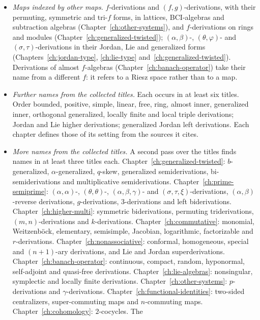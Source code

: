 \begin{itemize}
(Chapter~\ref{ch:polynomial-weyl}): right derivations. Partial derivations of
functions of $n$ variables. Each chapter defines its kinds from the sources it cites.
\item \emph{Maps indexed by other maps.} $f$-derivations and
$(f,g)$-derivations, with their permuting, symmetric and tri-$f$ forms, in
lattices, BCI-algebras and subtraction algebras (Chapter~\ref{ch:other-systems}),
and $f$-derivations on rings and modules (Chapter~\ref{ch:generalized-twisted});
$(\alpha,\beta)$-, $(\theta,\varphi)$- and $(\sigma,\tau)$-derivations in their
Jordan, Lie and generalized forms (Chapters~\ref{ch:jordan-type},
\ref{ch:lie-type} and~\ref{ch:generalized-twisted}). Derivations of almost
$f$-algebras (Chapter~\ref{ch:banach-operator}) take their name from a different
$f$: it refers to a Riesz space rather than to a map.
\item \emph{Further names from the collected titles.} Each occurs in at least six
titles. Order bounded, positive, simple, linear, free, ring, almost inner,
generalized inner, orthogonal generalized, locally finite and local triple
derivations; Jordan and Lie higher derivations; generalized Jordan left
derivations. Each chapter defines those of its setting from the sources it cites.
\item \emph{More names from the collected titles.} A second pass over the
titles finds names in at least three titles each. Chapter~\ref{ch:generalized-twisted}:
$b$-generalized, $\alpha$-generalized, $q$-skew, generalized semiderivations,
bi-semiderivations and multiplicative semiderivations.
Chapter~\ref{ch:prime-semiprime}: $(\alpha,\alpha)$-, $(\theta,\theta)$-,
$(\alpha,\beta,\gamma)$- and $(\sigma,\tau,\xi)$-derivations,
$(\alpha,\beta)$-reverse derivations, $g$-derivations, $3$-derivations and left
biderivations. Chapter~\ref{ch:higher-multi}: symmetric biderivations,
permuting triderivations, $(m,n)$-derivations and $k$-derivations.
Chapter~\ref{ch:commutative}: monomial, Weitzenb\"ock, elementary, semisimple,
Jacobian, logarithmic, factorizable and $r$-derivations.
Chapter~\ref{ch:nonassociative}: conformal, homogeneous, special and
$(n+1)$-ary derivations, and Lie and Jordan superderivations.
Chapter~\ref{ch:banach-operator}: continuous, compact, random, hyponormal,
self-adjoint and quasi-free derivations. Chapter~\ref{ch:lie-algebras}:
nonsingular, symplectic and locally finite derivations.
Chapter~\ref{ch:other-systems}: $p$-derivations and $\gamma$-derivations.
Chapter~\ref{ch:functional-identities}: two-sided centralizers, super-commuting
maps and $n$-commuting maps. Chapter~\ref{ch:cohomology}: $2$-cocycles. The

\end{itemize}
